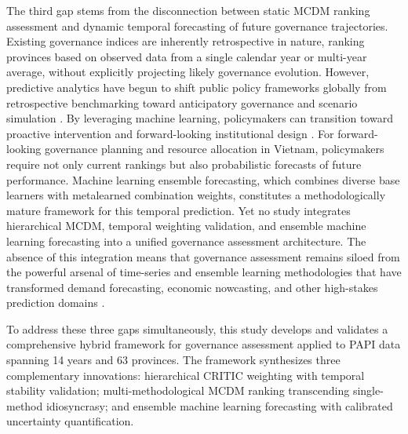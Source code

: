 \documentclass[12pt,a4paper]{article}
\begin{document}
The third gap stems from the disconnection between static MCDM ranking assessment and dynamic temporal forecasting of future governance trajectories. Existing governance indices are inherently retrospective in nature, ranking provinces based on observed data from a single calendar year or multi-year average, without explicitly projecting likely governance evolution. However, predictive analytics have begun to shift public policy frameworks globally from retrospective benchmarking toward anticipatory governance and scenario simulation \citep{Maffei2020, Williamson2016}. By leveraging machine learning, policymakers can transition toward proactive intervention and forward-looking institutional design \citep{Athey2017}. For forward-looking governance planning and resource allocation in Vietnam, policymakers require not only current rankings but also probabilistic forecasts of future performance. Machine learning ensemble forecasting, which combines diverse base learners with metalearned combination weights, constitutes a methodologically mature framework for this temporal prediction. Yet no study integrates hierarchical MCDM, temporal weighting validation, and ensemble machine learning forecasting into a unified governance assessment architecture. The absence of this integration means that governance assessment remains siloed from the powerful arsenal of time-series and ensemble learning methodologies that have transformed demand forecasting, economic nowcasting, and other high-stakes prediction domains \citep{Hastie2009, Wolpert1992}.


To address these three gaps simultaneously, this study develops and validates a comprehensive hybrid framework for governance assessment applied to PAPI data spanning 14 years and 63 provinces. The framework synthesizes three complementary innovations: hierarchical CRITIC weighting with temporal stability validation; multi-methodological MCDM ranking transcending single-method idiosyncrasy; and ensemble machine learning forecasting with calibrated uncertainty quantification.
\end{document}
